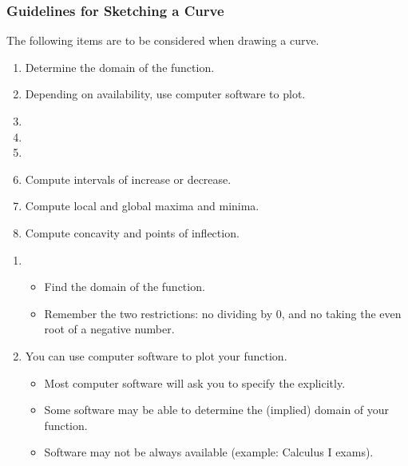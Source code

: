 \begin{frame}
\frametitle{Guidelines for Sketching a Curve}
The following items are to be considered when drawing a curve. 
\begin{enumerate}
\item  Determine the domain of the function.
\item  Depending on availability, use computer software to plot.
\item  {}
\item  {}
\item  {}
\item  Compute intervals of increase or decrease.
\item  Compute local and global maxima and minima.
\item  Compute concavity and points of inflection.
\end{enumerate}
\end{frame}

\begin{frame}[t]
\begin{enumerate}
\item  {}
\begin{itemize}
\item  Find the domain of the function.
\item  Remember the two restrictions: no dividing by $0$, and no taking the even root of a negative number.
\end{itemize}
\item<2-> You can use computer software to plot your function.
\begin{itemize}
\item<3-> Most computer software will ask you to specify the  explicitly.
\item<4-> Some software may be able to determine the (implied) domain of your function.
\item<5-> Software may not be always available (example: Calculus I exams).
\end{itemize}
\end{enumerate}
\end{frame}


